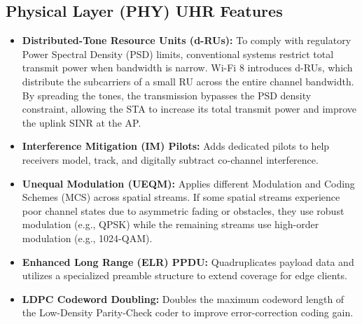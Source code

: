 \subsection{Physical Layer (PHY) UHR Features}
\begin{itemize}
    \item \textbf{Distributed-Tone Resource Units (d-RUs):} To comply with regulatory Power Spectral Density (PSD) limits, conventional systems restrict total transmit power when bandwidth is narrow. Wi-Fi 8 introduces d-RUs, which distribute the subcarriers of a small RU across the entire channel bandwidth. By spreading the tones, the transmission bypasses the PSD density constraint, allowing the STA to increase its total transmit power and improve the uplink SINR at the AP.
    \item \textbf{Interference Mitigation (IM) Pilots:} Adds dedicated pilots to help receivers model, track, and digitally subtract co-channel interference.
    \item \textbf{Unequal Modulation (UEQM):} Applies different Modulation and Coding Schemes (MCS) across spatial streams. If some spatial streams experience poor channel states due to asymmetric fading or obstacles, they use robust modulation (e.g., QPSK) while the remaining streams use high-order modulation (e.g., 1024-QAM).
    \item \textbf{Enhanced Long Range (ELR) PPDU:} Quadruplicates payload data and utilizes a specialized preamble structure to extend coverage for edge clients.
    \item \textbf{LDPC Codeword Doubling:} Doubles the maximum codeword length of the Low-Density Parity-Check coder to improve error-correction coding gain.
\end{itemize}

